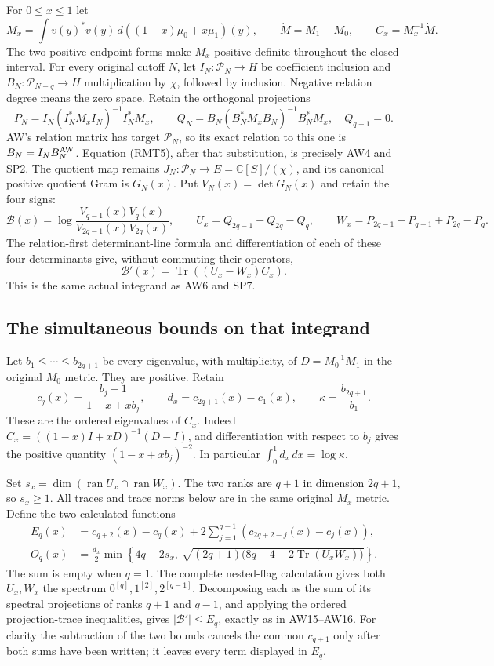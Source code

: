 For \(0\leq x\leq1\) let
\[
 M_x=\int v(y)^*v(y)\,d((1-x)\mu_0+x\mu_1)(y),\qquad
 \dot M=M_1-M_0,\qquad C_x=M_x^{-1}\dot M.
 \tag{RMT4}
\]
The two positive endpoint forms make \(M_x\) positive definite
throughout the closed interval.  For every original cutoff \(N\),
let \(I_N:\mathcal P_N\to H\) be coefficient inclusion and
\(B_N:\mathcal P_{N-q}\to H\) multiplication by \(\chi\), followed
by inclusion.  Negative relation degree means the zero space.
Retain the orthogonal projections
\[
 P_N=I_N(I_N^*M_xI_N)^{-1}I_N^*M_x,\qquad
 Q_N=B_N(B_N^*M_xB_N)^{-1}B_N^*M_x,\quad Q_{q-1}=0.
 \tag{RMT5}
\]
AW's relation matrix has target \(\mathcal P_N\), so its exact
relation to this one is \(B_N=I_N B_N^{\rm AW}\).
Equation (RMT5), after that substitution, is precisely AW4 and SP2.
The quotient map remains \(J_N:\mathcal P_N\to E=\mathbb{C}[S]/(\chi)\),
and its canonical positive quotient Gram is \(G_N(x)\).
Put \(V_N(x)=\det G_N(x)\) and retain the four signs:
\[
 \mathcal B(x)=\log\frac{V_{q-1}(x)V_q(x)}
                              {V_{2q-1}(x)V_{2q}(x)},\qquad
 U_x=Q_{2q-1}+Q_{2q}-Q_q,\qquad
 W_x=P_{2q-1}-P_{q-1}+P_{2q}-P_q.
 \tag{RMT6}
\]
The relation-first determinant-line formula and differentiation of
each of these four determinants give, without commuting their
operators,
\[
 \mathcal B'(x)=\operatorname{Tr}((U_x-W_x)C_x).
 \tag{RMT7}
\]
This is the same actual integrand as AW6 and SP7.

\subsection{The simultaneous bounds on that integrand}

Let \(b_1\leq\cdots\leq b_{2q+1}\) be every eigenvalue, with
multiplicity, of \(D=M_0^{-1}M_1\) in the original \(M_0\) metric.
They are positive.  Retain
\[
 c_j(x)=\frac{b_j-1}{1-x+xb_j},\qquad
 d_x=c_{2q+1}(x)-c_1(x),\qquad
 \kappa=\frac{b_{2q+1}}{b_1}.
 \tag{RMT8}
\]
These are the ordered eigenvalues of \(C_x\).  Indeed
\(C_x=((1-x)I+xD)^{-1}(D-I)\), and differentiation with
respect to \(b_j\) gives the positive quantity
\((1-x+xb_j)^{-2}\).  In particular
\(\int_0^1d_x\,dx=\log\kappa\).

Set \(s_x=\dim(\operatorname{ran}U_x\cap\operatorname{ran}W_x)\).
The two ranks are \(q+1\) in dimension \(2q+1\), so \(s_x\geq1\).
All traces and trace norms below are in the same original \(M_x\)
metric.  Define the two calculated functions
\[
 \begin{split}
 E_q(x)&=c_{q+2}(x)-c_q(x)
       +2\sum_{j=1}^{q-1}(c_{2q+2-j}(x)-c_j(x)),\\
 O_q(x)&=\frac{d_x}{2}\min\left\{
 4q-2s_x,\
 \sqrt{(2q+1)\bigl(8q-4-2\operatorname{Tr}(U_xW_x)\bigr)}
 \right\}.
 \end{split}
 \tag{RMT9}
\]
The sum is empty when \(q=1\).
The complete nested-flag calculation gives both \(U_x,W_x\)
the spectrum \(0^{[q]},1^{[2]},2^{[q-1]}\).  Decomposing each
as the sum of its spectral projections of ranks \(q+1\) and
\(q-1\), and applying the ordered projection-trace inequalities,
gives \(|\mathcal B'|\leq E_q\), exactly as in AW15--AW16.
For clarity the subtraction of the two bounds cancels the
common \(c_{q+1}\) only after both sums have been written; it
leaves every term displayed in \(E_q\).

